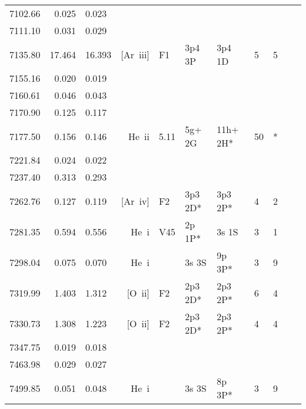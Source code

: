 \begin{longtable}{lrlrlllllll}
 7102.66 &   0.025 &   0.023                                                                                      \\
 7111.10 &   0.031 &   0.029                                                                                      \\
 7135.80 &  17.464 &  16.393 &  [Ar~{\sc iii}]  &  F1        &  3p4 3P    &  3p4 1D    &          5 &        5    \\
 7155.16 &   0.020 &   0.019                                                                                      \\
 7160.61 &   0.046 &   0.043                                                                                      \\
 7170.90 &   0.125 &   0.117                                                                                      \\
 7177.50 &   0.156 &   0.146 &  He~{\sc ii}     &  5.11      &  5g+ 2G    &  11h+ 2H*  &         50 &        *    \\
 7221.84 &   0.024 &   0.022                                                                                      \\
 7237.40 &   0.313 &   0.293                                                                                      \\
 7262.76 &   0.127 &   0.119 &  [Ar~{\sc iv}]   &  F2        &  3p3 2D*   &  3p3 2P*   &          4 &        2    \\
 7281.35 &   0.594 &   0.556 &  He~{\sc i}      &  V45       &  2p 1P*    &  3s 1S     &          3 &        1    \\
 7298.04 &   0.075 &   0.070 &  He~{\sc i}      &            &  3s 3S     &  9p 3P*    &          3 &        9    \\
 7319.99 &   1.403 &   1.312 &  [O~{\sc ii}]    &  F2        &  2p3 2D*   &  2p3 2P*   &          6 &        4    \\
 7330.73 &   1.308 &   1.223 &  [O~{\sc ii}]    &  F2        &  2p3 2D*   &  2p3 2P*   &          4 &        4    \\
 7347.75 &   0.019 &   0.018                                                                                      \\
 7463.98 &   0.029 &   0.027                                                                                      \\
 7499.85 &   0.051 &   0.048 &  He~{\sc i}      &            &  3s 3S     &  8p 3P*    &          3 &        9    \\

\end{longtable}
